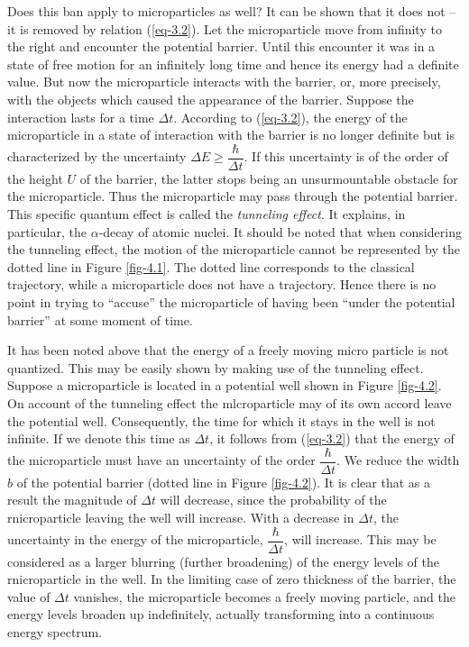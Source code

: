 \documentclass[a4paper,sfsidenotes,colorlinks=true]{tufte-book}
\numberwithin{equation}{section}
\numberwithin{figure}{section}
\begin{document}
Does this ban apply to microparticles as well? It can be shown that it
does not -- it is removed by relation (\ref{eq-3.2}). Let the
microparticle move from infinity to the right and encounter the
potential barrier. Until this encounter it was in a state of free
motion for an infinitely long time and hence its energy had a definite
value. But now the microparticle interacts with the barrier, or, more
precisely, with the objects which caused the appearance of the
barrier. Suppose the interaction lasts for a time $\Delta
t$. According to (\ref{eq-3.2}), the energy of the microparticle in a
state of interaction with the barrier is no longer definite but is
characterized by the uncertainty $\Delta E \ge \dfrac{\hbar}{\Delta
  t}$. If this uncertainty is of the order of the height $U$ of the
barrier, the latter stops being an unsurmountable obstacle for the
microparticle. Thus the microparticle may pass through the potential
barrier. This specific quantum effect is called the \emph{tunneling
  effect}. It explains, in particular, the $\alpha$-decay of atomic
nuclei. It should be noted that when considering the tunneling effect,
the motion of the microparticle cannot be represented by the dotted
line in Figure \ref{fig-4.1}. The dotted line corresponds to the classical
trajectory, while a microparticle does not have a trajectory. Hence
there is no point in trying to ``accuse'' the microparticle of having
been ``under the potential barrier'' at some moment of time.

\begin{fullwidth}
  \setlength{\leftskip}{3cm} \textsf{\small It has been noted above
    that the energy of a freely moving micro particle is not
    quantized. This may be easily shown by making use of the tunneling
    effect. Suppose a microparticle is located in a potential well
    shown in Figure \ref{fig-4.2}. On account of the tunneling effect
    the mlcroparticle may of its own accord leave the potential
    well. Consequently, the time for which it stays in the well is not
    infinite. If we denote this time as $\Delta t$, it follows from
    (\ref{eq-3.2}) that the energy of the microparticle must have an
    uncertainty of the order $\dfrac{\hbar}{\Delta t}$. We reduce the
    width $b$ of the potential barrier (dotted line in Figure
    \ref{fig-4.2}). It is clear that as a result the magnitude of
    $\Delta t$ will decrease, since the probability of the
    rnicroparticle leaving the well will increase. With a decrease in
    $\Delta t$, the uncertainty in the energy of the microparticle,
    $\dfrac{\hbar }{\Delta t}$, will increase. This may be considered
    as a larger blurring (further broadening) of the energy levels of
    the rnicroparticle in the well. In the limiting case of zero
    thickness of the barrier, the value of $\Delta t$ vanishes, the
    microparticle becomes a freely moving particle, and the energy
    levels broaden up indefinitely, actually transforming into a
    continuous energy spectrum.}
\end{fullwidth}
\vspace{5pt}
\setlength{\leftskip}{0pt}
\end{document}
